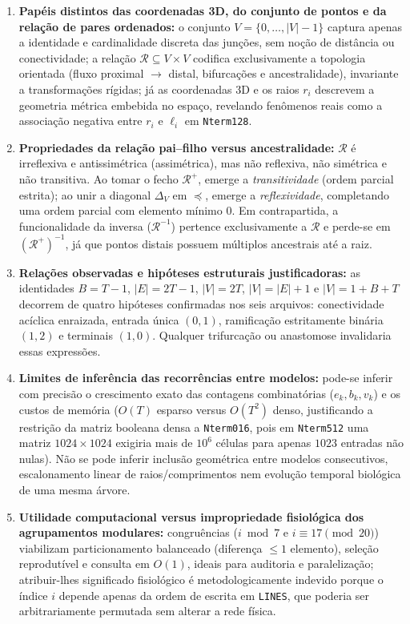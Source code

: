\documentclass[11pt, a4paper]{article}
\begin{document}
\begin{enumerate}[leftmargin=*, label=\textbf{Q\arabic*.}]
  \item \textbf{Papéis distintos das coordenadas 3D, do conjunto de pontos e da relação de pares ordenados:} o conjunto $V = \{0,\dots,|V|-1\}$ captura apenas a identidade e cardinalidade discreta das junções, sem noção de distância ou conectividade; a relação $\mathcal{R} \subseteq V \times V$ codifica exclusivamente a topologia orientada (fluxo proximal $\to$ distal, bifurcações e ancestralidade), invariante a transformações rígidas; já as coordenadas 3D e os raios $r_i$ descrevem a geometria métrica embebida no espaço, revelando fenômenos reais como a associação negativa entre $r_i$ e $\ell_i$ em \texttt{Nterm128}.
  \item \textbf{Propriedades da relação pai--filho versus ancestralidade:} $\mathcal{R}$ é irreflexiva e antissimétrica (assimétrica), mas não reflexiva, não simétrica e não transitiva. Ao tomar o fecho $\mathcal{R}^+$, emerge a \emph{transitividade} (ordem parcial estrita); ao unir a diagonal $\Delta_V$ em $\preceq$, emerge a \emph{reflexividade}, completando uma ordem parcial com elemento mínimo $0$. Em contrapartida, a funcionalidade da inversa ($\mathcal{R}^{-1}$) pertence exclusivamente a $\mathcal{R}$ e perde-se em $(\mathcal{R}^+)^{-1}$, já que pontos distais possuem múltiplos ancestrais até a raiz.
  \item \textbf{Relações observadas e hipóteses estruturais justificadoras:} as identidades $B = T - 1$, $|E| = 2T - 1$, $|V| = 2T$, $|V| = |E| + 1$ e $|V| = 1 + B + T$ decorrem de quatro hipóteses confirmadas nos seis arquivos: conectividade acíclica enraizada, entrada única $(0,1)$, ramificação estritamente binária $(1,2)$ e terminais $(1,0)$. Qualquer trifurcação ou anastomose invalidaria essas expressões.
  \item \textbf{Limites de inferência das recorrências entre modelos:} pode-se inferir com precisão o crescimento exato das contagens combinatórias ($e_k, b_k, v_k$) e os custos de memória ($O(T)$ esparso versus $O(T^2)$ denso, justificando a restrição da matriz booleana densa a \texttt{Nterm016}, pois em \texttt{Nterm512} uma matriz $1024\times 1024$ exigiria mais de $10^6$ células para apenas $1023$ entradas não nulas). Não se pode inferir inclusão geométrica entre modelos consecutivos, escalonamento linear de raios/comprimentos nem evolução temporal biológica de uma mesma árvore.
  \item \textbf{Utilidade computacional versus impropriedade fisiológica dos agrupamentos modulares:} congruências ($i \bmod 7$ e $i \equiv 17 \pmod{20}$) viabilizam particionamento balanceado (diferença $\le 1$ elemento), seleção reprodutível e consulta em $O(1)$, ideais para auditoria e paralelização; atribuir-lhes significado fisiológico é metodologicamente indevido porque o índice $i$ depende apenas da ordem de escrita em \texttt{LINES}, que poderia ser arbitrariamente permutada sem alterar a rede física.
\end{enumerate}
\end{document}
